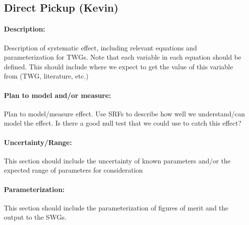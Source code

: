 \subsection{Direct Pickup (Kevin)}

\paragraph{Description:}
Description of systematic effect, including relevant equations and
parameterization for TWGs. Note that each variable in each equation should be
defined. This should include where we expect to get the value of this variable
from (TWG, literature, etc.)

\paragraph{Plan to model and/or measure:}
Plan to model/measure effect. Use SRFs to describe how well we understand/can model the effect. Is there a good null test that we could use to catch this effect?

\paragraph{Uncertainty/Range:}
This section should include the uncertainty of
known parameters and/or the expected range of parameters for consideration

\paragraph{Parameterization:}
This section should include the parameterization of figures of
merit and the output to the SWGs.
